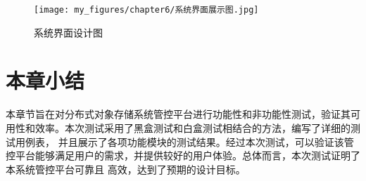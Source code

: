 \begin{figure}[htb]
    \centering
    \texttt{[image: my\_figures/chapter6/系统界面展示图.jpg]}
    \caption{系统界面设计图}
    \label{fig:系统界面设计图}
\end{figure}

\section{本章小结}

本章节旨在对分布式对象存储系统管控平台进行功能性和非功能性测试，验证其可用性和效率。本次测试采用了黑盒测试和白盒测试相结合的方法，编写了详细的测试用例表，
并且展示了各项功能模块的测试结果。经过本次测试，可以验证该管控平台能够满足用户的需求，并提供较好的用户体验。总体而言，本次测试证明了本系统管控平台可靠且
高效，达到了预期的设计目标。